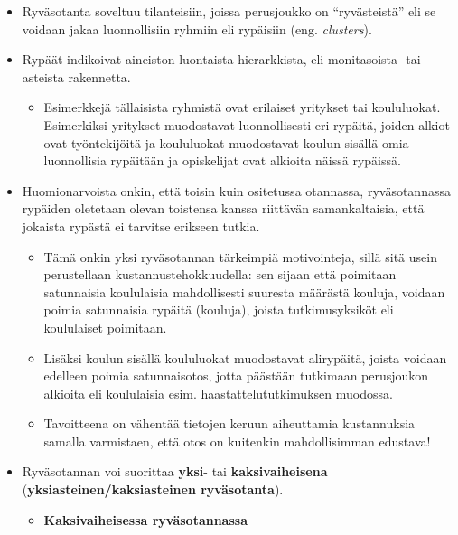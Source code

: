 \documentclass[
]{book}
\providecommand{\tightlist}{%
  \setlength{\itemsep}{0pt}\setlength{\parskip}{0pt}}
\begin{document}
\begin{itemize}
\item
  Ryväsotanta soveltuu tilanteisiin, joissa perusjoukko on ``ryvästeistä'' eli se voidaan jakaa luonnollisiin ryhmiin eli rypäisiin (eng. \emph{clusters}).
\item
  Rypäät indikoivat aineiston luontaista hierarkkista, eli monitasoista- tai asteista rakennetta.

  \begin{itemize}
  \tightlist
  \item
    Esimerkkejä tällaisista ryhmistä ovat erilaiset yritykset tai koululuokat. Esimerkiksi yritykset muodostavat luonnollisesti eri rypäitä, joiden alkiot ovat työntekijöitä ja koululuokat muodostavat koulun sisällä omia luonnollisia rypäitään ja opiskelijat ovat alkioita näissä rypäissä.
  \end{itemize}
\item
  Huomionarvoista onkin, että toisin kuin ositetussa otannassa, ryväsotannassa rypäiden oletetaan olevan toistensa kanssa riittävän samankaltaisia, että jokaista rypästä ei tarvitse erikseen tutkia.

  \begin{itemize}
  \tightlist
  \item
    Tämä onkin yksi ryväsotannan tärkeimpiä motivointeja, sillä sitä usein perustellaan kustannustehokkuudella: sen sijaan että poimitaan satunnaisia koululaisia mahdollisesti suuresta määrästä kouluja, voidaan poimia satunnaisia rypäitä (kouluja), joista tutkimusyksiköt eli koululaiset poimitaan.
  \item
    Lisäksi koulun sisällä koululuokat muodostavat alirypäitä, joista voidaan edelleen poimia satunnaisotos, jotta päästään tutkimaan perusjoukon alkioita eli koululaisia esim. haastattelututkimuksen muodossa.
  \item
    Tavoitteena on vähentää tietojen keruun aiheuttamia kustannuksia samalla varmistaen, että otos on kuitenkin mahdollisimman edustava!
  \end{itemize}
\item
  Ryväsotannan voi suorittaa \textbf{yksi}- tai \textbf{kaksivaiheisena} (\textbf{yksiasteinen/kaksiasteinen ryväsotanta}).

  \begin{itemize}
  \tightlist
  \item
    \textbf{Kaksivaiheisessa ryväsotannassa}


\end{itemize}
\end{itemize}
\end{document}
